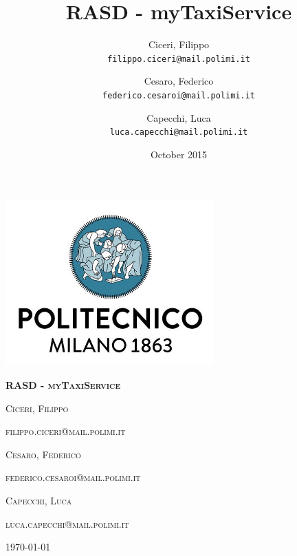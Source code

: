 \documentclass[12pt,a4paper,titlepage]{article}
\title{RASD - myTaxiService}
\author{
	Ciceri, Filippo \\
	\texttt{filippo.ciceri@mail.polimi.it}
	\and
	Cesaro, Federico \\
	\texttt{federico.cesaroi@mail.polimi.it}
	\and
	Capecchi, Luca \\
	\texttt{luca.capecchi@mail.polimi.it}
}
\date{October 2015}
\begin{document}
\begin{titlepage}
	\centering
	\includegraphics[width=8cm]{polimiLogo}\par\vspace{2cm}
	{\scshape\huge\bfseries RASD - myTaxiService \par}
	\vspace{1.5cm}
	{\scshape\large Ciceri, Filippo \par}
	{\scshape\normalsize filippo.ciceri@mail.polimi.it \par}
	\vspace{0.5cm}
	{\scshape\large Cesaro, Federico \par}
	{\scshape\normalsize federico.cesaroi@mail.polimi.it \par}
	\vspace{0.5cm}
	{\scshape\large Capecchi, Luca \par}
	{\scshape\normalsize luca.capecchi@mail.polimi.it \par}
	\vspace{0.5cm}

	\vfill

	{\large \today\par}
\end{titlepage}
\tableofcontents
\newpage

\newpage


\newpage


\newpage


\newpage


\newpage


\newpage

\end{document}
